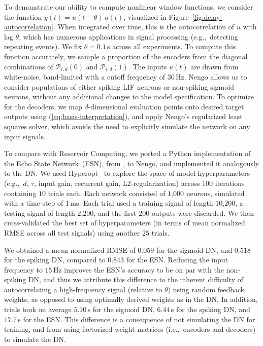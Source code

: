 To demonstrate our ability to compute nonlinear window functions, we consider the function $y(t) = u(t - \theta)\, u(t)$, visualized in Figure~\ref{fig:delay-autocorrelation}.
When integrated over time, this is the autocorrelation of $u$ with lag $\theta$, which has numerous applications in signal processing (e.g.,~detecting repeating events).
We fix $\theta = 0.1$\,s across all experiments.
To compute this function accurately, we sample a proportion of the encoders from the diagonal combinations of $\mathcal{P}_{i, d}(0)$ and $\mathcal{P}_{i, d}(1)$.
The inputs $u(t)$ are drawn from white-noise, band-limited with a cutoff frequency of $30$\,Hz.
Nengo allows us to consider populations of either spiking LIF neurons or non-spiking sigmoid neurons, without any additional changes to the model specification.
To optimize for the decoders, we map $d$-dimensional evaluation points onto desired target outputs using (\ref{eq:basis-interpretation}), and apply Nengo's regularized least squares solver, which avoids the need to explicitly simulate the network on any input signals.

To compare with Reservoir Computing, we ported a Python implementation of the Echo State Network~(ESN), from \cite{lukovsevivcius2009reservoir}, to Nengo, and implemented it analogously to the DN.
We used Hyperopt~\citep{bergstra2015hyperopt} to explore the space of model hyperparameters (e.g.,~$d$, $\tau$, input gain, recurrent gain, L2-regularization) across $100$ iterations containing $10$ trials each.
Each network consisted of $1\text{,}000$ neurons, simulated with a time-step of $1$\,ms.
Each trial used a training signal of length $10\text{,}200$, a testing signal of length $2\text{,}200$, and the first $200$ outputs were discarded.
We then cross-validated the best set of hyperparameters (in terms of mean normalized RMSE across all test signals) using another $25$ trials.

We obtained a mean normalized RMSE of $0.059$ for the sigmoid DN, and $0.518$ for the spiking DN, compared to $0.843$ for the ESN.
Reducing the input frequency to $15$\,Hz improves the ESN's accuracy to be on par with the non-spiking DN, and thus we attribute this difference to the inherent difficulty of autocorrelating a high-frequency signal (relative to $\theta$) using random feedback weights, as opposed to using optimally derived weights as in the DN.
In addition, trials took on average $5.10$\,s for the sigmoid DN, $6.44$\,s for the spiking DN, and $17.7$\,s for the ESN.
This difference is a consequence of not simulating the DN for training, and from using factorized weight matrices (i.e.,~encoders and decoders) to simulate the DN.

